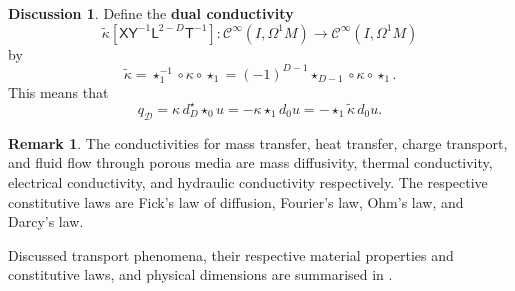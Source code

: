 \documentclass{elsarticle}
\theoremstyle{definition}
\newtheorem{discussion}[theorem]{Discussion}
\newtheorem{remark}[theorem]{Remark}
\newcommand{\newterm}[1]{\textbf{#1}}
\newcommand{\amount}{\mathsf{X}}
\newcommand{\potential}{\mathsf{Y}}
\newcommand{\length}{\mathsf{L}}
\renewcommand{\time}{\mathsf{T}}
\newcommand{\diffusive}{\mathcal{D}}
\begin{document}
\begin{discussion}
  Define the \newterm{dual conductivity}
  \begin{equation}
    \label{eq:continuum/dual_conductivity_definition}
   \widetilde{\kappa} [\amount \potential^{-1} \length^{2 - D} \time^{-1}] \colon \mathcal{C}^\infty(I, \Omega^1 M) \to \mathcal{C}^\infty(I, \Omega^1 M)
  \end{equation}
  by
  \begin{equation}
    \label{eq:continuum/dual_conductivity_formula}
   \widetilde{\kappa}
    = \star_1^{-1} \circ \kappa \circ \star_1
    = (-1)^{D - 1} \star_{D - 1} \circ \kappa \circ \star_1.
  \end{equation}
  This means that
  \begin{equation}
    q_\diffusive
    = \kappa\, d^\star_D \star_0 u
    = - \kappa \star_1 d_0 u
    = - \star_1\widetilde{\kappa}\, d_0 u.
  \end{equation}
\end{discussion}
\begin{remark}
  The conductivities for mass transfer, heat transfer, charge transport, and fluid flow through porous media are mass diffusivity, thermal conductivity, electrical conductivity, and hydraulic conductivity respectively.
  The respective constitutive laws are Fick's law of diffusion, Fourier's law, Ohm's law, and Darcy's law.

  Discussed transport phenomena, their respective material properties and constitutive laws, and physical dimensions are summarised in .
\end{remark}
\end{document}
